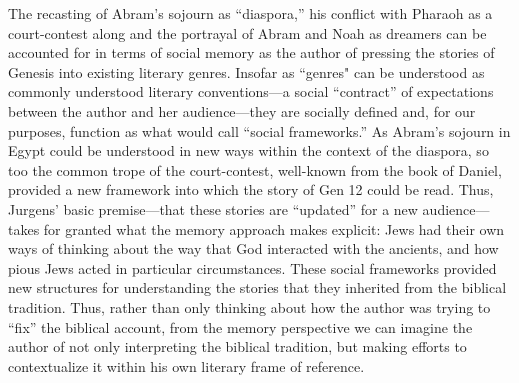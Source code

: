 The recasting of Abram's sojourn as ``diaspora,'' his conflict with Pharaoh as a court-contest along and the portrayal of Abram and Noah as dreamers can be accounted for in terms of social memory as the author of \ga pressing the stories of Genesis into existing literary genres. Insofar as ``genres" can be understood as commonly understood literary conventions---a social ``contract'' of expectations between the author and her audience---they are socially defined and, for our purposes, function as what \halbwachs would call ``social frameworks.'' As Abram's sojourn in Egypt could be understood in new ways within the context of the diaspora, so too the common trope of the court-contest, well-known from the book of Daniel, provided a new framework into which the story of Gen 12 could be read. Thus, Jurgens' basic premise---that these stories are ``updated'' for a new audience---takes for granted what the memory approach makes explicit: \secondtemple Jews had their own ways of thinking about the way that God interacted with the ancients, and how pious Jews acted in particular circumstances. These social frameworks provided new structures for understanding the stories that they inherited from the biblical tradition. Thus, rather than only thinking about how the author was trying to ``fix'' the biblical account, from the memory perspective we can imagine the author of \ga not only interpreting the biblical tradition, but making efforts to contextualize it within his own literary frame of reference.